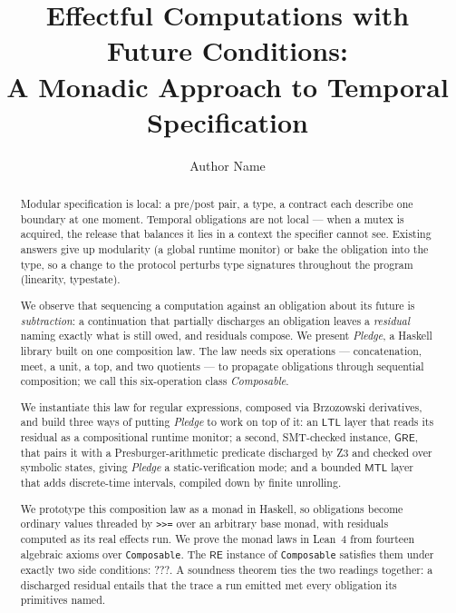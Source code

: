 \documentclass[acmsmall,screen]{acmart}
\newcommand{\RE}{\mathsf{RE}}
\newcommand{\GRE}{\mathsf{GRE}}
\newcommand{\LTL}{\mathsf{LTL}}
\newcommand{\MTL}{\mathsf{MTL}}
\begin{document}
\title{Effectful Computations with Future Conditions:\texorpdfstring{\\}{}
       A Monadic Approach to Temporal Specification}

\author{Author Name}

\begin{abstract}
Modular specification is local: a pre/post pair, a type, a contract each
describe one boundary at one moment.
Temporal obligations are not local --- when a mutex is acquired, the release
that balances it lies in a context the specifier cannot see.
Existing answers give up modularity (a global runtime monitor) or bake the
obligation into the type, so a change to the protocol perturbs type
signatures throughout the program (linearity, typestate).

We observe that sequencing a computation against an obligation about its
future is \emph{subtraction}: a continuation that partially
discharges an obligation leaves a \emph{residual} naming exactly what is
still owed, and residuals compose.
We present \emph{Pledge}, a Haskell library built on one composition law.
The law needs six operations --- concatenation, meet, a unit, a top, and
two quotients --- to propagate obligations through sequential composition;
we call this six-operation class \emph{Composable}.

We instantiate this law for regular expressions, composed via
Brzozowski derivatives, and build three ways of putting \emph{Pledge}
to work on top of it: an $\LTL$ layer that reads its residual as a
compositional runtime monitor; a second, SMT-checked instance, $\GRE$,
that pairs it with a Presburger-arithmetic predicate discharged by Z3 and
checked over symbolic states, giving \emph{Pledge} a
static-verification mode; and a bounded $\MTL$ layer that adds
discrete-time intervals, compiled down by finite unrolling.

We prototype this composition law as a monad in Haskell, so obligations become ordinary
values threaded by \lstinline{>>=} over an arbitrary base monad, with
residuals computed as its real effects run.
We prove the monad laws in Lean~4 from fourteen algebraic axioms over
\lstinline{Composable}.
The $\RE$ instance of \lstinline{Composable} satisfies them under
exactly two side conditions: ???.
A soundness theorem ties the two readings together: a discharged residual
entails that the trace a run emitted met every obligation its primitives
named.
\end{abstract}
\end{document}
